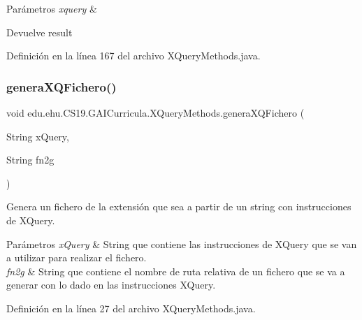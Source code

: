 \begin{DoxyParams}{Parámetros}
{\em xquery} & \\
\hline
\end{DoxyParams}
\begin{DoxyReturn}{Devuelve}
result 
\end{DoxyReturn}


Definición en la línea 167 del archivo X\+Query\+Methods.\+java.

\mbox{\label{a00033_a7d2040d47b8350ca48da7ce5b658fab2}} 
\subsubsection{\texorpdfstring{generaXQFichero()}{generaXQFichero()}}
{\footnotesize\ttfamily void edu.\+ehu.\+C\+S19.\+G\+A\+I\+Curricula.\+X\+Query\+Methods.\+genera\+X\+Q\+Fichero (\begin{DoxyParamCaption}\item[{String}]{x\+Query,  }\item[{String}]{fn2g }\end{DoxyParamCaption})}



Genera un fichero de la extensión que sea a partir de un string con instrucciones de X\+Query. 


\begin{DoxyParams}{Parámetros}
{\em x\+Query} & String que contiene las instrucciones de X\+Query que se van a utilizar para realizar el fichero. \\
\hline
{\em fn2g} & String que contiene el nombre de ruta relativa de un fichero que se va a generar con lo dado en las instrucciones X\+Query. \\
\hline
\end{DoxyParams}


Definición en la línea 27 del archivo X\+Query\+Methods.\+java.

\mbox{\label{a00033_ae60f32c5f8b4ffe3f2bdd1f44976eacf}} 
